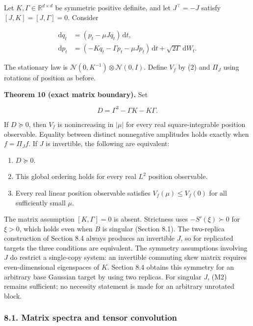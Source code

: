 \documentclass[
  british,
  11pt,
  a4paper,
]{article}
\providecommand{\tightlist}{%
  \setlength{\itemsep}{0pt}\setlength{\parskip}{0pt}}
\begin{document}
Let \(K,\Gamma\in\mathbb R^{d\times d}\) be symmetric positive definite,
and let \(J^\top=-J\) satisfy \([J,K]=[J,\Gamma]=0\). Consider

\[
\begin{aligned}
\mathrm dq_t&=(p_t-\mu Jq_t)\,\mathrm dt,\\
\mathrm dp_t&=(-Kq_t-\Gamma p_t-\mu Jp_t)\,\mathrm dt
                    +\sqrt{2\Gamma}\,\mathrm dW_t.
\end{aligned} \tag{M1}
\]

The stationary law is \(\mathcal N(0,K^{-1})\otimes\mathcal N(0,I)\).
Define \(V_f\) by (2) and \(\Pi_J\) using rotations of position as
before.

\textbf{Theorem 10 (exact matrix boundary).} Set

\[
\boxed{\displaystyle D=\Gamma^3-\Gamma K-K\Gamma.} \tag{M2}
\]

If \(D\succeq0\), then \(V_f\) is nonincreasing in \(|\mu|\) for every
real square-integrable position observable. Equality between distinct
nonnegative amplitudes holds exactly when \(f=\Pi_Jf\). If \(J\) is
invertible, the following are equivalent:

\begin{enumerate}
\def\labelenumi{\arabic{enumi}.}
\tightlist
\item
  \(D\succeq0\).
\item
  This global ordering holds for every real \(L^2\) position observable.
\item
  Every real linear position observable satisfies \(V_f(\mu)\le V_f(0)\)
  for all sufficiently small \(\mu\).
\end{enumerate}

The matrix assumption \([K,\Gamma]=0\) is absent. Strictness uses
\(-S'(\xi)\succ0\) for \(\xi>0\), which holds even when \(B\) is
singular (Section 8.1). The two-replica construction of Section 8.4
always produces an invertible \(J\), so for replicated targets the three
conditions are equivalent. The symmetry assumptions involving \(J\) do
restrict a single-copy system: an invertible commuting skew matrix
requires even-dimensional eigenspaces of \(K\). Section 8.4 obtains this
symmetry for an arbitrary base Gaussian target by using two replicas.
For singular \(J\), (M2) remains sufficient; no necessity statement is
made for an arbitrary unrotated block.

\subsubsection{8.1. Matrix spectra and tensor
convolution}\label{matrix-spectra-and-tensor-convolution}
\end{document}
